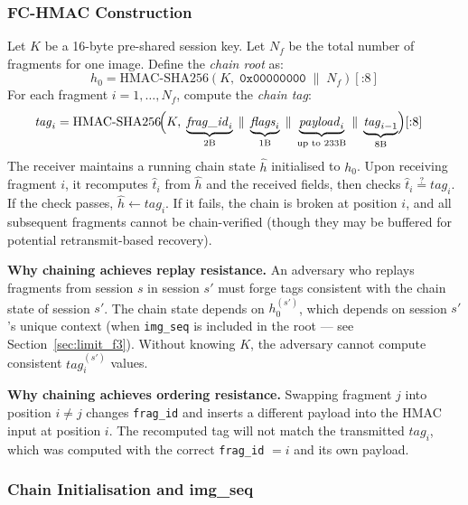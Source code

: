 \documentclass[journal]{IEEEtran}
\begin{document}
\subsubsection{FC-HMAC Construction}

Let $K$ be a 16-byte pre-shared session key.  Let $N_f$ be the total number
of fragments for one image.  Define the \emph{chain root} as:
\begin{equation}
  h_0 = \mathrm{HMAC\text{-}SHA256}(K,\;
        \mathtt{0x00000000} \;\|\; N_f)[\text{:}8]
  \label{eq:chain_root}
\end{equation}
For each fragment $i = 1, \ldots, N_f$, compute the \emph{chain tag}:
\begin{align}
  \mathit{tag}_i &= \mathrm{HMAC\text{-}SHA256}\!\Bigl(K,\;
    \underbrace{\mathit{frag\_id}_i}_{\text{2B}} \;\|\;
    \underbrace{\mathit{flags}_i}_{\text{1B}} \;\|\;
    \underbrace{\mathit{payload}_i}_{\text{up to 233B}} \;\|\;
    \underbrace{\mathit{tag}_{i-1}}_{\text{8B}}
  \Bigr)[\text{:}8]
  \label{eq:chain_tag}
\end{align}
The receiver maintains a running chain state $\hat{h}$ initialised to $h_0$.
Upon receiving fragment $i$, it recomputes $\hat{t}_i$ from $\hat{h}$ and the
received fields, then checks $\hat{t}_i \stackrel{?}{=} \mathit{tag}_i$.  If
the check passes, $\hat{h} \leftarrow \mathit{tag}_i$.  If it fails, the chain
is broken at position $i$, and all subsequent fragments cannot be chain-verified
(though they may be buffered for potential retransmit-based recovery).

\textbf{Why chaining achieves replay resistance.}  An adversary who replays
fragments from session $s$ in session $s'$ must forge tags consistent with the
chain state of session $s'$.  The chain state depends on $h_0^{(s')}$, which
depends on session $s'$'s unique context (when \texttt{img\_seq} is included
in the root --- see Section~\ref{sec:limit_f3}).  Without knowing $K$, the
adversary cannot compute consistent $\mathit{tag}_i^{(s')}$ values.

\textbf{Why chaining achieves ordering resistance.}  Swapping fragment $j$
into position $i \neq j$ changes \texttt{frag\_id} and inserts a different
payload into the HMAC input at position $i$.  The recomputed tag will not
match the transmitted $\mathit{tag}_i$, which was computed with the correct
\texttt{frag\_id} $= i$ and its own payload.

\subsubsection{Chain Initialisation and img\_seq}
\end{document}
